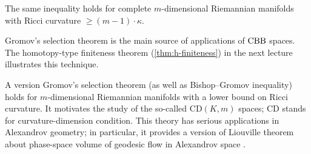 The same inequality holds for complete $m$-dimensional Riemannian manifolds with Ricci curvature $\ge (m-1)\cdot \kappa$.

Gromov's selection theorem is the main source of applications of $\mathrm{CBB}$ spaces.
The homotopy-type finiteness theorem (\ref{thm:h-finiteness}) in the next lecture illustrates this technique.

A version Gromov's selection theorem (as well as Bishop--Gromov inequality) holds for $m$-dimensional Riemannian manifolds with a lower bound on Ricci curvature.
It motivates the study of the so-called $\mathrm{CD}(K,m)$ spaces; $\mathrm{CD}$ stands for curvature-dimension condition.
This theory has serious applications in Alexandrov geometry;
in particular, it provides a version of Liouville theorem about phase-space volume of geodesic flow in Alexandrov space \cite{brue-mondino-semola}.
